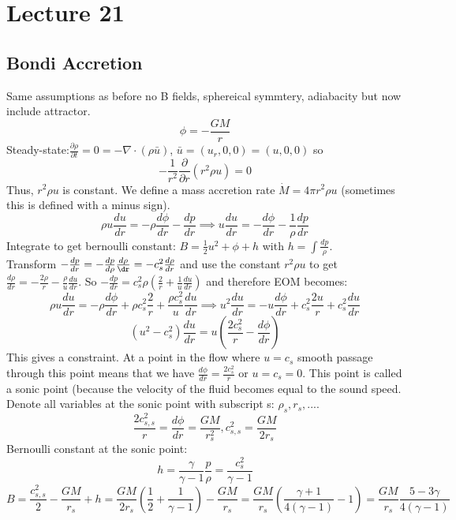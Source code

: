 \documentclass{article}
\begin{document}
\section{Lecture 21}
\subsection{Bondi Accretion}
Same assumptions as before no B fields, sphereical symmtery, adiabacity but now include attractor.
$$\phi = -\frac{GM}{r}$$
Steady-state:$\frac{\partial \rho}{\partial t} = 0= - \nabla \cdot (\rho \bar u)$, $\bar u = (u_r, 0 , 0) = (u, 0, 0)$ so
$$
- \frac{1}{r^2} \frac{\partial}{\partial r}(r^2 \rho u) = 0
$$
Thus, $r^2 \rho u$ is constant. We define a mass accretion rate $\dot M = 4 \pi r^2 \rho u$ (sometimes this is defined with a minus sign). 
$$
\rho u \frac{du}{dr} = - \rho \frac{d \phi}{dr} - \frac{dp}{dr} \implies u\frac{du}{dr} = - \frac{d \phi}{dr} - \frac{1}{\rho} \frac{dp}{dr}
$$
Integrate to get bernoulli constant: $B = \frac{1}{2} u^2 + \phi + h$ with $h = \int \frac{dp}{\rho}$. \\
Transform $-\frac{dp}{dr} = -\frac{dp}{d\rho}\frac{d \rho}{\dr} = - c_s^2 \frac{d \rho}{dr}$ and use the constant $r^2\rho u$ to get $\frac{d\rho}{dr} = -\frac{2\rho}{r} - \frac{\rho}{u} \frac{d u}{dr}$. So $- \frac{dp}{dr} = c^2_s \rho (\frac{2}{r} + \frac{1}{u}\frac{du}{dr})$ and therefore EOM becomes:
$$
\rho u \frac{du}{dr} = - \rho \frac{d\phi}{dr} + \rho c_s^2 \frac{2}{r} + \frac{\rho c_s^2}{u} \frac{du}{dr} \implies u^2 \frac{du}{dr} = - u \frac{d \phi}{dr} + c_s^2 \frac{2u}{r} + c_s^2 \frac{du}{dr}
$$
\begin{equation}
(u^2- c_s^2 ) \frac{du}{dr} = u (\frac{2 c_s^2}{r} - \frac{d\phi}{dr})
\end{equation}
This gives a constraint. At a point in the flow where $u= c_s$ smooth passage through this point means that we have $\frac{d\phi}{dr} = \frac{2c_s^2}{r}$ or $u =c_s  = 0$. This point is called a sonic point (because the velocity of the fluid becomes equal to the sound speed. Denote all variables at the sonic point with subscript s: $\rho_s, r_s,...$.
$$
\frac{2 c_{s,s}^2}{r} = \frac{d \phi}{dr} = \frac{GM}{r_s^2}, c_{s,s}^2 = \frac{GM}{2r_s}
$$
Bernoulli constant at the sonic point:
$$
h = \frac{\gamma}{\gamma -1} \frac{p}{\rho} = \frac{c_s^2}{\gamma -1}
$$
$$
B= \frac{c_{s,s}^2}{2} - \frac{GM}{r_s} + h = \frac{GM}{2r_s} (\frac{1}{2} + \frac{1}{\gamma -1}) - \frac{GM}{r_s} = \frac{GM}{r_s} (\frac{\gamma +1}{4 (\gamma -1)} -1) = \frac{GM}{r_s} \frac{5-3\gamma}{4(\gamma-1)} 
$$
\end{document}
